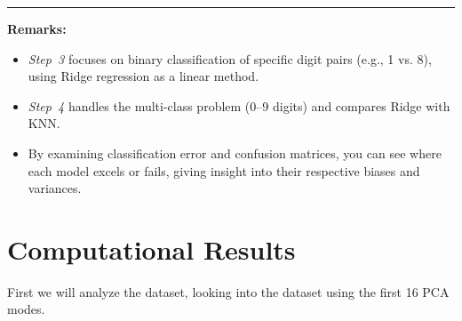 \documentclass[11pt]{amsart}
\begin{document}
\vspace{1em}
\hrule
\vspace{1em}

\noindent
\textbf{Remarks:}
\begin{itemize}
    \item \emph{Step~3} focuses on binary classification of specific digit pairs (e.g., 1 vs. 8), using Ridge regression as a linear method. 
    \item \emph{Step~4} handles the multi-class problem (0--9 digits) and compares Ridge with KNN. 
    \item By examining classification error and confusion matrices, you can see where each model excels or fails, giving insight into their respective biases and variances.
\end{itemize}
    
\section{Computational Results}

First we will analyze the dataset, looking into the dataset using the first 16 PCA modes. 
\end{document}
